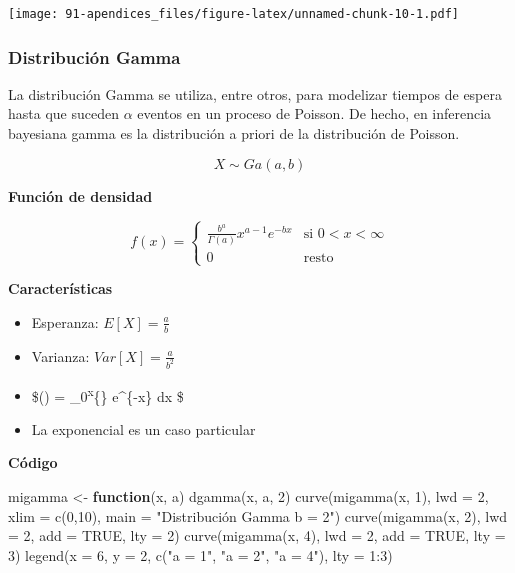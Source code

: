 \documentclass[
]{article}
\newenvironment{Shaded}{\begin{snugshade}}{\end{snugshade}}
\newcommand{\AttributeTok}[1]{\textcolor[rgb]{0.77,0.63,0.00}{#1}}
\newcommand{\ConstantTok}[1]{\textcolor[rgb]{0.00,0.00,0.00}{#1}}
\newcommand{\ControlFlowTok}[1]{\textcolor[rgb]{0.13,0.29,0.53}{\textbf{#1}}}
\newcommand{\DecValTok}[1]{\textcolor[rgb]{0.00,0.00,0.81}{#1}}
\newcommand{\FunctionTok}[1]{\textcolor[rgb]{0.00,0.00,0.00}{#1}}
\newcommand{\NormalTok}[1]{#1}
\newcommand{\OtherTok}[1]{\textcolor[rgb]{0.56,0.35,0.01}{#1}}
\newcommand{\SpecialCharTok}[1]{\textcolor[rgb]{0.00,0.00,0.00}{#1}}
\newcommand{\StringTok}[1]{\textcolor[rgb]{0.31,0.60,0.02}{#1}}
\providecommand{\tightlist}{%
  \setlength{\itemsep}{0pt}\setlength{\parskip}{0pt}}
\begin{document}
\texttt{[image: 91-apendices\_files/figure-latex/unnamed-chunk-10-1.pdf]}

\hypertarget{distribuciuxf3n-gamma}{%
\subsubsection{Distribución Gamma}\label{distribuciuxf3n-gamma}}

La distribución Gamma se utiliza, entre otros, para modelizar tiempos de
espera hasta que suceden \(\alpha\) eventos en un proceso de Poisson. De
hecho, en inferencia bayesiana gamma es la distribución a priori de la
distribución de Poisson.

\[X \sim \mathit{Ga}(a, b)\]

\textbf{Función de densidad}

\[f(x) =
\begin{cases}
\frac{b^a}{\Gamma(a)}x^{a-1}{e}^{-bx} & \text{si } 0 < x < \infty\\
0 & \text{resto }
\end{cases}\]

\textbf{Características}

\begin{itemize}
\tightlist
\item
  Esperanza: \(E[X] = \frac{a}{b}\)
\item
  Varianza: \(\mathit{Var}[X] = \frac{a}{b^2}\)
\item
  \$\Gamma(\alpha) = \int\_0\textsuperscript{\infty x}\{\}
  e\^{}\{-x\} dx \$
\item
  La exponencial es un caso particular
\end{itemize}

\textbf{Código}

\begin{Shaded}
\begin{Highlighting}[]
\NormalTok{migamma }\OtherTok{\textless{}{-}} \ControlFlowTok{function}\NormalTok{(x, a) }\FunctionTok{dgamma}\NormalTok{(x, a, }\DecValTok{2}\NormalTok{)}
\FunctionTok{curve}\NormalTok{(}\FunctionTok{migamma}\NormalTok{(x, }\DecValTok{1}\NormalTok{), }\AttributeTok{lwd =} \DecValTok{2}\NormalTok{, }\AttributeTok{xlim =} \FunctionTok{c}\NormalTok{(}\DecValTok{0}\NormalTok{,}\DecValTok{10}\NormalTok{), }
      \AttributeTok{main =} \StringTok{"Distribución Gamma b = 2"}\NormalTok{)}
\FunctionTok{curve}\NormalTok{(}\FunctionTok{migamma}\NormalTok{(x, }\DecValTok{2}\NormalTok{), }\AttributeTok{lwd =} \DecValTok{2}\NormalTok{, }\AttributeTok{add =} \ConstantTok{TRUE}\NormalTok{, }\AttributeTok{lty =} \DecValTok{2}\NormalTok{)}
\FunctionTok{curve}\NormalTok{(}\FunctionTok{migamma}\NormalTok{(x, }\DecValTok{4}\NormalTok{), }\AttributeTok{lwd =} \DecValTok{2}\NormalTok{, }\AttributeTok{add =} \ConstantTok{TRUE}\NormalTok{, }\AttributeTok{lty =} \DecValTok{3}\NormalTok{)}
\FunctionTok{legend}\NormalTok{(}\AttributeTok{x =} \DecValTok{6}\NormalTok{, }\AttributeTok{y =} \DecValTok{2}\NormalTok{, }\FunctionTok{c}\NormalTok{(}\StringTok{"a = 1"}\NormalTok{, }\StringTok{"a = 2"}\NormalTok{, }\StringTok{"a = 4"}\NormalTok{), }\AttributeTok{lty =} \DecValTok{1}\SpecialCharTok{:}\DecValTok{3}\NormalTok{)}
\end{Highlighting}
\end{Shaded}
\end{document}
